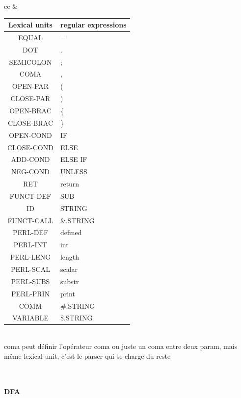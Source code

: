\documentclass[a4paper,10pt]{article}
\begin{document}
\begin{tabular}{cc}
&

\begin{tabular}{|c|l|}
\hline
Lexical units  		& regular expressions \\ \hline
EQUAL				& = \\ \hline
DOT					& . \\ \hline
SEMICOLON			& ; \\ \hline
COMA				& , \\ \hline
OPEN-PAR			& ( \\ \hline
CLOSE-PAR			& ) \\ \hline
OPEN-BRAC			& \{ \\ \hline
CLOSE-BRAC			& \} \\ \hline
OPEN-COND			& IF \\ \hline
CLOSE-COND 			& ELSE \\ \hline
ADD-COND			& ELSE IF \\ \hline
NEG-COND			& UNLESS \\ \hline
RET					& return \\ \hline
FUNCT-DEF			& SUB \\ \hline
ID					& STRING \\ \hline 
FUNCT-CALL			& \&.STRING \\ \hline
PERL-DEF			& defined  \\ \hline
PERL-INT			& int  \\ \hline
PERL-LENG			& length  \\ \hline
PERL-SCAL			& scalar  \\ \hline
PERL-SUBS			& substr  \\ \hline
PERL-PRIN			& print\\ \hline
COMM				& \#.STRING \\ \hline
VARIABLE			& \$.STRING \\ \hline
					


\end{tabular}
\end{tabular}
~\\

coma peut définir l'opérateur coma ou juste un coma entre deux param, mais même lexical unit, c'est le parser qui se charge du reste


\pagebreak
~\\
\paragraph{DFA}~\\
\end{document}
